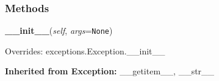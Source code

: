 
  \subsubsection{Methods}

    \label{pipeline:SegmentError:__init__}
    \vspace{0.5ex}

    \noindent\begin{boxedminipage}{\textwidth}

    \raggedright \textbf{\_\_init\_\_}(\textit{self}, \textit{args}=\texttt{N\-o\-n\-e\-})

      Overrides: exceptions.Exception.\_\_init\_\_

    \end{boxedminipage}

  \noindent\textbf{Inherited from Exception:}
    \_\_getitem\_\_,
    \_\_str\_\_
